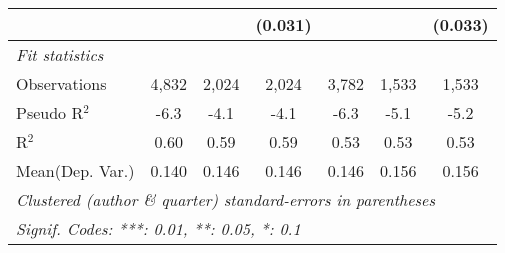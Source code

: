 \begin{tabular}{lcccccc}
                           &               &         & (0.031) &                &             & (0.033)\\   
   \midrule
   \emph{Fit statistics}\\
   Observations            & 4,832         & 2,024   & 2,024   & 3,782          & 1,533       & 1,533\\  
   Pseudo R$^2$            & -6.3          & -4.1    & -4.1    & -6.3           & -5.1        & -5.2\\  
   R$^2$                   & 0.60          & 0.59    & 0.59    & 0.53           & 0.53        & 0.53\\  
Mean(Dep. Var.) & 0.140 & 0.146 & 0.146 & 0.146 & 0.156 & 0.156 \\
   \midrule \midrule
   \multicolumn{7}{l}{\emph{Clustered (author \& quarter) standard-errors in parentheses}}\\
   \multicolumn{7}{l}{\emph{Signif. Codes: ***: 0.01, **: 0.05, *: 0.1}}\\
\end{tabular}
\par\endgroup
